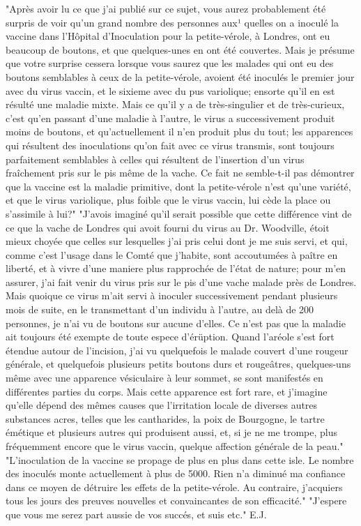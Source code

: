 "Après avoir lu ce que j'ai publié sur ce sujet, vous aurez probablement été surpris de voir qu'un grand nombre des personnes aux¹ quelles on a inoculé la vaccine dans l'Hôpital d'Inoculation pour la petite-vérole, à Londres, ont eu beaucoup de boutons, et que quelques-unes en ont été couvertes. Mais je présume\setcounter{page}{190} que votre surprise cessera lorsque vous saurez que les malades qui ont eu des boutons semblables à ceux de la petite-vérole, avoient été inoculés le premier jour avec du virus vaccin, et le sixieme avec du pus variolique; ensorte qu'il en est résulté une maladie mixte. Mais ce qu'il y a de très-singulier et de très-curieux, c'est qu'en passant d'une maladie à l'autre, le virus a successivement produit moins de boutons, et qu'actuellement il n'en produit plus du tout; les apparences qui résultent des inoculations qu'on fait avec ce virus transmis, sont toujours parfaitement semblables à celles qui résultent de l'insertion d'un virus fraîchement pris sur le pis même de la vache. Ce fait ne semble-t-il pas démontrer que la vaccine est la maladie primitive, dont la petite-vérole n'est qu'une variété, et que le virus variolique, plus foible que le virus vaccin, lui cède la place ou s'assimile à lui?"
"J'avois imaginé qu'il serait possible que cette différence vint de ce que la vache de Londres qui avoit fourni du virus au Dr. Woodville, étoit mieux choyée que celles sur lesquelles j'ai pris celui dont je me suis servi, et qui, comme c'est l'usage dans le Comté que j'habite, sont accoutumées à paître en liberté, et à vivre d'une maniere plus rapprochée de l'état de nature; pour m'en assurer,\setcounter{page}{191} j’ai fait venir du virus pris sur le pis d’une vache malade près de Londres. Mais quoique ce virus m’ait servi à inoculer successivement pendant plusieurs mois de suite, en le transmettant d’un individu à l’autre, au delà de 200 personnes, je n’ai vu de boutons sur aucune d’elles. Ce n’est pas que la maladie ait toujours été exempte de toute espece d’érüption. Quand l’aréole s’est fort étendue autour de l’incision, j’ai vu quelquefois le malade couvert d’une rougeur générale, et quelquefois plusieurs petits boutons durs et rougeâtres, quelques-uns même avec une apparence vésiculaire à leur sommet, se sont manifestés en différentes parties du corps. Mais cette apparence est fort rare, et j’imagine qu’elle dépend des mêmes causes que l’irritation locale de diverses autres substances acres, telles que les cantharides, la poix de Bourgogne, le tartre émétique et plusieurs autres qui produisent aussi, et, si je ne me trompe, plus fréquemment encore que le virus vaccin, quelque affection générale de la peau."
"L’inoculation de la vaccine se propage de plus en plus dans cette isle. Le nombre des inoculés monte actuellement à plus de 5000. Rien n’a diminué ma confiance dans ce moyen de détruire les effets de la petite-vérole. Au contraire, j’acquiers tous les jours des preuves\setcounter{page}{192} nouvelles et convaincantes de son efficacité."
"J'espere que vous me serez part aussie de vos succés, et suis etc."
E.J.

